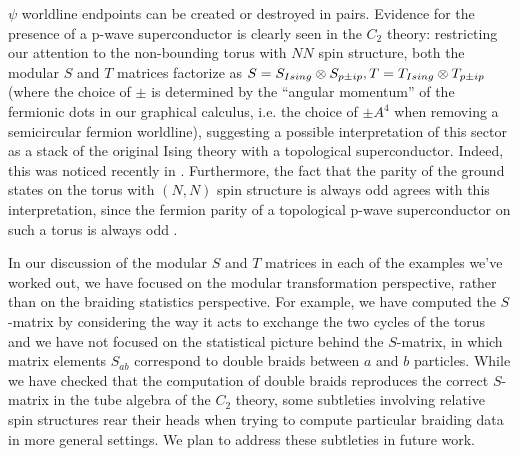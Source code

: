 $\psi$ worldline endpoints can be created or destroyed in pairs. 
Evidence for the presence of a p-wave superconductor is clearly seen in the $C_2$ theory: 
restricting our attention to the non-bounding torus with $NN$ spin structure, both the modular $S$ and $T$ matrices 
factorize as $S=S_{Ising}\otimes S_{p\pm ip}, T = T_{Ising} \otimes T_{p\pm ip}$ (where the 
choice of $\pm$ is determined by the ``angular momentum'' of the fermionic dots 
in our graphical calculus, i.e. the choice of $\pm A^4$ when removing a semicircular fermion
worldline), suggesting a possible interpretation of this sector 
as a stack of the original Ising theory with a topological superconductor. 
Indeed, this was noticed recently in \cite{ware2016}.
Furthermore, the fact that the parity of the ground states on the torus with $(N,N)$ spin structure is always 
odd agrees with this interpretation, since the fermion parity of a topological 
p-wave superconductor on such a torus is always odd \cite{you2015}.

In our discussion of the modular $S$ and $T$ matrices in each of the examples we've worked out, 
we have focused on the modular transformation perspective, rather than on the braiding statistics perspective. 
For example, we have computed the $S$-matrix by considering the way it acts to exchange the two 
cycles of the torus and 
we have not focused on the statistical picture behind the $S$-matrix, in which matrix elements $S_{ab}$ correspond to double braids between $a$ and $b$ particles. 
While we have checked that the computation of double braids reproduces the correct $S$-matrix 
in the tube algebra of the $C_2$ theory, some subtleties involving relative spin structures rear their heads when trying to compute particular braiding data in more general settings. 
We plan to address these subtleties in future work. 

